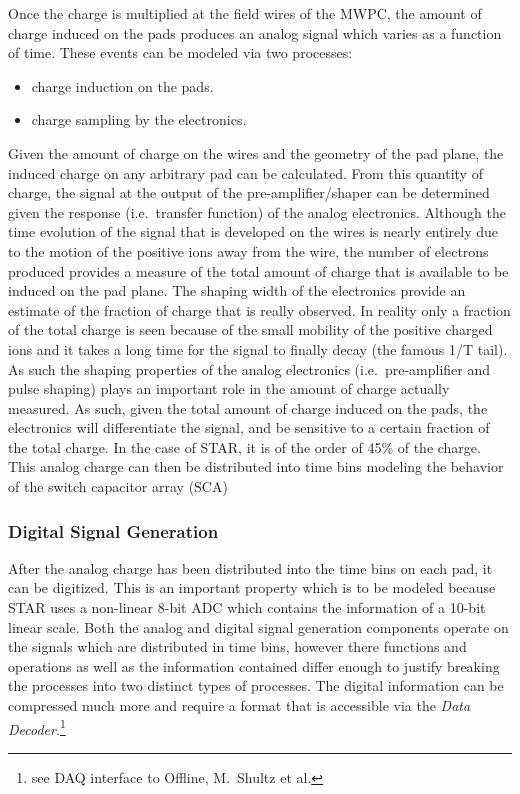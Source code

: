 \documentclass[twoside]{article}
\begin{document}
Once the charge is multiplied at the field wires of the MWPC, the
amount of charge induced on the pads produces an analog signal which
varies as a function of time.  These events can be modeled via two 
processes:
\begin{itemize}
  \item charge induction on the pads.
  \item charge sampling by the electronics.
\end{itemize}
Given
the amount of charge on the wires and the geometry of the pad plane,
the induced charge on any arbitrary pad can be calculated.  From this
quantity of charge, the signal at the output of the pre-amplifier/shaper
can be determined given the response (i.e.~transfer function) of the
analog electronics.  Although the
time evolution of the signal that is developed on the wires is nearly 
entirely due to the motion of the positive ions away from the wire, 
the number of electrons produced provides a measure of the total amount
of charge that is available to be induced on the pad plane.  The shaping
width of the electronics provide an estimate of the fraction of charge
that is really observed.  In reality only a fraction of the total charge 
is seen because of the
small mobility of the positive charged ions and it takes a long
time for the signal to finally decay (the famous 1/T tail).
As such the shaping 
properties of the analog electronics (i.e.~pre-amplifier and pulse shaping)
plays an important role in the amount of charge actually measured.
As such, given the total amount of charge induced on the pads, the
electronics will differentiate the signal, and be sensitive to a 
certain fraction of the total charge.  In the case of STAR, it is of
the order of 45\% of the charge.  This analog charge can then be distributed
into time bins modeling the behavior of the switch capacitor array (SCA)

\subsubsection{Digital Signal Generation}
\label{sec:digitalSignalGeneration}

After the analog charge has been distributed into the time bins on
each pad, it can be digitized.  This is an important property which
is to be modeled because STAR uses a non-linear 8-bit ADC which
contains the information of a 10-bit linear scale.  Both the analog
and digital signal generation components operate on the signals
which are distributed in time bins, however there functions and operations
as well as the information contained differ enough to justify breaking 
the processes into two distinct types of processes.  The digital information
can be compressed much more and require a format that is accessible
via the {\em Data Decoder}.\footnote{see DAQ interface to Offline, M.~Shultz et al.}
\end{document}
